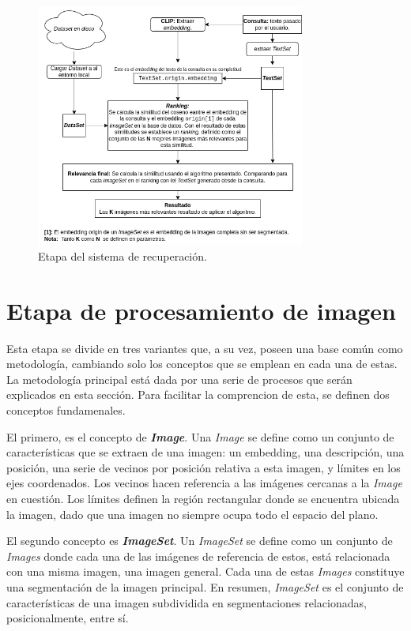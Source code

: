 \begin{figure}[H]
\centering
\includegraphics[height=80mm]{Graphics/SystemRetrieval.drawio.png}
\caption{Etapa del sistema de recuperaci\'on.}
\label{fig:etapa3}
\end{figure}


\section{Etapa de procesamiento de imagen}
Esta etapa se divide en tres variantes que, a su vez, poseen una base común como metodología, cambiando solo los conceptos que se emplean en cada una de estas. La metodología principal está dada por una serie de procesos que serán explicados en esta sección. Para facilitar la comprencion de esta, se definen dos conceptos fundamenales.

El primero, es el concepto de \textbf{\textit{Image}}. Una \textit{Image} se define como un conjunto de características que se extraen de una imagen: un embedding, una descripción, una posición, una serie de vecinos por posición relativa a esta imagen, y límites en los ejes coordenados. Los vecinos hacen referencia a las imágenes cercanas a la \textit{Image} en cuestión. Los límites definen la región rectangular donde se encuentra ubicada la imagen, dado que una imagen no siempre ocupa todo el espacio del plano.

El segundo concepto es \textbf{\textit{ImageSet}}. Un \textit{ImageSet} se define como un conjunto de \textit{Images} donde cada una de las imágenes de referencia de estos, está relacionada con una misma imagen, una imagen general. Cada una de estas \textit{Images} constituye una segmentación de la imagen principal. En resumen, \textit{ImageSet} es el conjunto de características de una imagen subdividida en segmentaciones relacionadas, posicionalmente, entre s\'i. 


